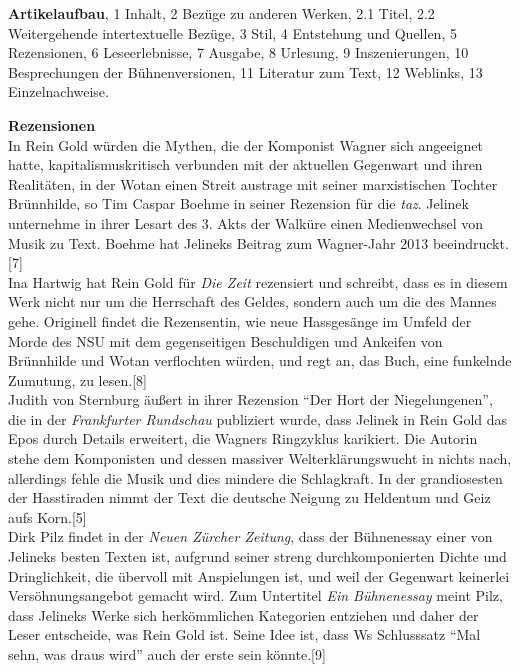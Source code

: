\documentclass[fontsize=12pt]{scrartcl}
\begin{document}
\textbf{Artikelaufbau}, 1 Inhalt, 2 Bez\"uge zu anderen Werken, 2.1 Titel, 2.2 Weitergehende intertextuelle Bez\"uge, 3 Stil, 4 Entstehung und Quellen, 5 Rezensionen, 6 Leseerlebnisse, 7 Ausgabe, 8 Urlesung, 9 Inszenierungen, 10 Besprechungen der B\"uhnen\-versionen, 11 Li\-te\-ra\-tur zum Text, 12 Weblinks, 13 Einzelnachweise.

\textbf{Rezensionen}\\
In Rein Gold w\"urden die Mythen, die der Komponist Wagner sich ange\-eig\-net hatte, kapitalismuskritisch verbunden mit der aktuellen Gegenwart und ihren Realit\"aten, in der Wotan einen Streit austrage mit seiner marxistischen Tochter Br\"unnhilde, so Tim Caspar Boehme in seiner Rezension f\"ur die \textit{taz}. Jelinek unternehme in ihrer Lesart des 3. Akts der Walk\"ure einen Medienwechsel von Musik zu Text. Boehme hat Jelineks Beitrag zum Wagner-Jahr 2013 beeindruckt.[7]\\
Ina Hartwig hat Rein Gold f\"ur \textit{Die Zeit} rezensiert und schreibt, dass es in diesem Werk nicht nur um die Herrschaft des Geldes, sondern auch um die des Mannes gehe. Originell findet die Rezensentin, wie neue Hassges\"ange im Umfeld der Morde des NSU mit dem gegenseitigen Beschuldigen und Ankeifen von Br\"unnhilde und Wotan verflochten w\"urden, und regt an, das Buch, eine funkelnde Zumutung, zu lesen.[8]\\
Judith von Sternburg \"au{\ss}ert in ihrer Rezension "`Der Hort der Niegelungenen"', die in der \textit{Frankfurter Rundschau} pu\-bli\-ziert wurde, dass Jelinek in Rein Gold das Epos durch Details erweitert, die Wagners Ringzyklus karikiert. Die Autorin stehe dem Komponisten und dessen massiver Welterkl\"arungswucht in nichts nach, al\-ler\-dings fehle die Musik und dies mindere die Schlagkraft. In der grandiosesten der Hass\-tiraden nimmt der Text die deutsche Neigung zu Heldentum und Geiz aufs Korn.[5]\\
Dirk Pilz findet in der \textit{Neuen Z\"urcher Zeitung}, dass der B\"uhnenessay einer von Jelineks besten Texten ist, aufgrund seiner streng durchkomponierten Dichte und Dring\-lichkeit, die \"ubervoll mit Anspielungen ist, und weil der Gegenwart keinerlei Vers\"ohnungsangebot gemacht wird. Zum Untertitel \textit{Ein B\"uhnenessay} meint Pilz, dass Jelineks Werke sich herk\"ommlichen Kategorien entziehen und daher der Leser entscheide, was Rein Gold ist. Seine Idee ist, dass Ws Schlusssatz "`Mal sehn, was draus wird"' auch der erste sein k\"onnte.[9]
\end{document}
